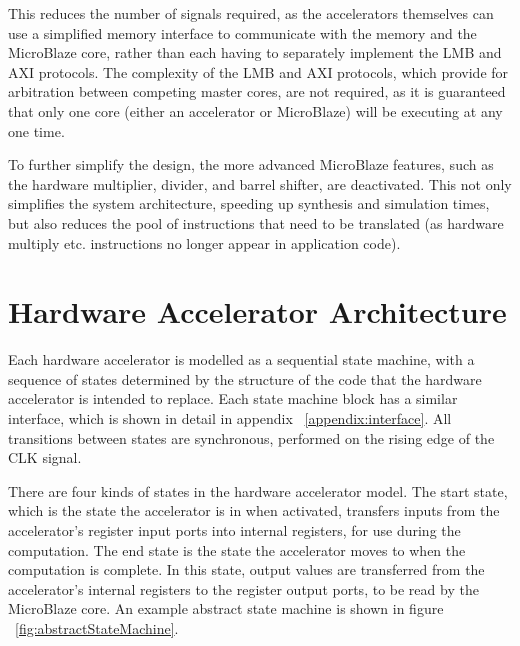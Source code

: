 \documentclass{UoYCSproject}
\begin{document}
This reduces the number of signals required, as the accelerators themselves can use a simplified memory interface to communicate
with the memory and the MicroBlaze core, rather than each having to separately implement the LMB and AXI protocols.
The complexity of the LMB and AXI protocols, which provide for arbitration between competing master cores, are not required,
as it is guaranteed that only one core (either an accelerator or MicroBlaze) will be executing at any one time.

To further simplify the design, the more advanced MicroBlaze features, such as the hardware multiplier, divider, and barrel
shifter, are deactivated. This not only simplifies the system architecture, speeding up synthesis and simulation times, but also
reduces the pool of instructions that need to be translated (as hardware multiply etc. instructions no longer appear in
application code).

\section{Hardware Accelerator Architecture}

Each hardware accelerator is modelled as a sequential state machine, with a sequence of states determined by the structure
of the code that the hardware accelerator is intended to replace. Each state machine block has a similar interface, which is
shown in detail in appendix ~\ref{appendix:interface}. All transitions between states are synchronous, performed on the rising edge of the CLK
signal.

There are four kinds of states in the hardware accelerator model. The start state, which is the state the accelerator is in
when activated, transfers inputs from the accelerator's register input ports into internal registers, for use during the
computation. The end state is the state the accelerator moves to when the computation is complete. In this state, output values
are transferred from the accelerator's internal registers to the register output ports, to be read by the MicroBlaze core.
An example abstract state machine is shown in figure ~\ref{fig:abstractStateMachine}.
\end{document}
